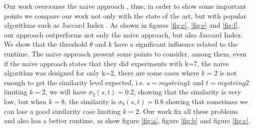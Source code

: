 Our work overcomes the naive approach \cite{seker2014novel}, thus, in order to show some important points we compare our work not only with the state of the art, but with popular algorithms such as Jaccard Index \cite{jaccard1912distribution}.
As shown in figures \ref{fig:c}, \ref{fig:e} and \ref{fig:f}, our approach outperforms not only the naive approach, but also Jaccard Index. We show that the threshold $\theta$ and $k$ have a significant influence related to the runtime.
The naive approach present some points to consider, among them, even if the naive approach states that they did experiments with k=7, the naive algorithm was designed for only k=2, there are some cases where $k=2$ is not enough to get the similarity level expected, i.e. $s=mystring1$ and $t=mystring2$ limiting $k=2$, we will have $\sigma_2(s,t)=0.2$, showing that the similarity is very low, but when $k=8$, the similarity is $\sigma_8(s,t)=0.8$ showing that sometimes we can lose a good similarity case limiting $k=2$.
Our work fix all these problems and also has a better runtime, as show figure \ref{fig:a}, figure \ref{fig:b} and figure \ref{fig:c}.


		
		
		

